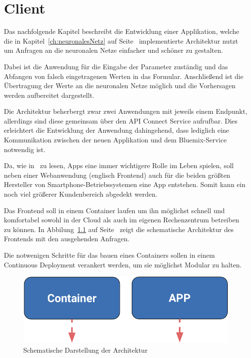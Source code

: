 \chapter{Client}
\label{ch:client}
Das nachfolgende Kapitel beschreibt die Entwicklung einer Applikation, welche die in Kapitel~\ref{ch:neuronalesNetz}
auf Seite~\pageref{ch:neuronalesNetz} implementierte Architektur nutzt um Anfragen an die neuronalen Netze einfacher
und schöner zu gestalten.

Dabei ist die Anwendung für die Eingabe der Parameter zuständig und das Abfangen von falsch eingetragenen Werten in
das Formular. Anschließend ist die Übertragung der Werte an die neuronalen Netze möglich und die Vorhersagen werden
aufbereitet dargestellt.

Die Architektur beherbergt zwar zwei Anwendungen mit jeweils einem Endpunkt, allerdings sind diese gemeinsam über
den API Connect Service aufrufbar. Dies erleichtert die Entwicklung der Anwendung dahingehend, dass lediglich eine 
Kommunikation zwischen der neuen Applikation und dem Bluemix-Service notwendig ist.

Da, wie in~\cite{online_client_apps} zu lesen, Apps eine immer wichtigere Rolle im Leben spielen, soll neben einer
Webanwendung (englisch Frontend) auch für die beiden größten Hersteller von Smartphone-Betriebssystemen eine App 
entstehen. Somit kann ein noch viel größerer Kundenbereich abgedekt werden.

Das Frontend soll in einem Container laufen um ihn möglichst schnell und komfortabel sowohl in der Cloud als auch 
im eigenen Rechenzentrum betreiben zu können. In Abbilung~\ref{fig:schematische_architektur_4} auf 
Seite~\pageref{fig:schematische_architektur_4} zeigt die schematische Architektur des Frontends mit den ausgehenden
Anfragen. 

Die notwenigen Schritte für das bauen eines Containers sollen in einem Continuous Deployment verankert werden, um sie 
möglichst Modular zu halten.

\begin{figure}[h]
    \centering
    \includegraphics[scale=0.5]{images/kapitel_4/architektur_schematisch.pdf}
    \caption{Schematische Darstellung der Architektur}
    \label{fig:schematische_architektur_4}
\end{figure}